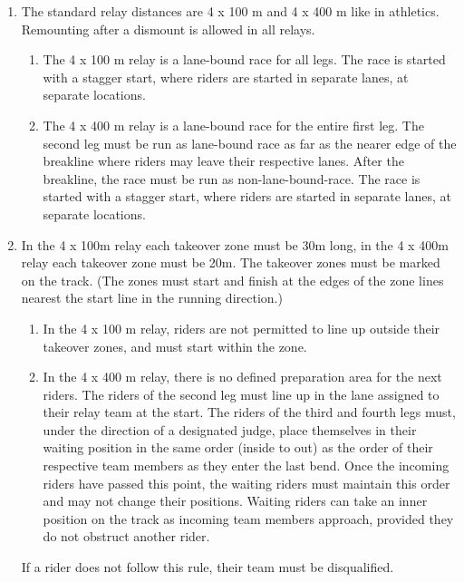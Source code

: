 \begin{enumerate}[leftmargin=1.5em,labelsep=*]
	\item The standard relay distances are 4 x 100 m and 4 x 400 m like in athletics.
	Remounting after a dismount is allowed in all relays.

	\begin{enumerate}[label*=\arabic*,leftmargin=1.5em,labelsep=*]
		\item The 4 x 100 m relay is a lane-bound race for all legs.
			The race is started with a stagger start, where riders are started in separate lanes, at separate locations.
		
		\item The 4 x 400 m relay is a lane-bound race for the entire first leg.
      The second leg must be run as lane-bound race as far as the nearer edge of the breakline where riders may leave their respective lanes.
      After the breakline, the race must be run as non-lane-bound-race.
      The race is started with a stagger start, where riders are started in separate lanes, at separate locations.
	\end{enumerate}
	
	\item In the 4 x 100m relay each takeover zone must be 30m long, in the 4 x 400m relay each takeover zone must be 20m.
	The takeover zones must be marked on the track.
	(The zones must start and finish at the edges of the zone lines nearest the start line in the running direction.)
	\begin{enumerate}[label*=\arabic*,leftmargin=1.5em,labelsep=*]
		\item In the 4 x 100 m relay, riders are not permitted to line up outside their takeover zones, and	must start within the zone.
		
		\item In the 4 x 400 m relay, there is no defined preparation area for the next riders.
    The riders of the second leg must line up in the lane assigned to their relay team at the start.
		The riders of the third and fourth legs must, under the direction of a designated judge, 
    place themselves in their waiting position in the same order (inside to out) as the order of their 
    respective team members as they enter the last bend.
		Once the incoming riders have passed this point, the waiting riders must maintain this order and 
    may not change their positions.
		Waiting riders can take an inner position on the track as incoming team members approach, 
    provided they do not obstruct another rider.
	\end{enumerate}
	If a rider does not follow this rule, their team must be disqualified.
	

\end{enumerate}
